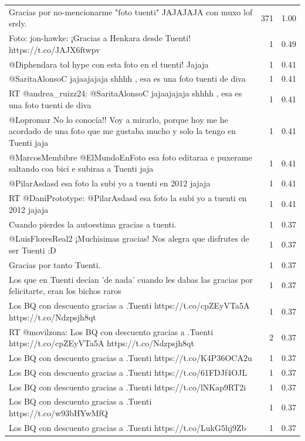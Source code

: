 \begin{longtable}{p{12.5cm}rr}
\bottomrule
\endlastfoot
Gracias por no-mencionarme "foto tuenti" JAJAJAJA con muxo lof srsly. & 371 & 1.00 \\
Foto: jon-hawke: ¡Gracias a Henkara desde Tuenti! https://t.co/JAJX6ftwpv & 1 & 0.49 \\
@Diphendara tol hype con esta foto en el tuenti! Jajaja & 1 & 0.41 \\
@SaritaAlonsoC jajaajajaja shhhh , esa es una foto tuenti de diva & 1 & 0.41 \\
RT @andrea\_ruizz24: @SaritaAlonsoC jajaajajaja shhhh , esa es una foto tuenti de diva & 1 & 0.41 \\
@Lopromar No lo conocía!! Voy a mirarlo, porque hoy me he acordado de una foto que me gustaba mucho y solo la tengo en Tuenti jaja & 1 & 0.41 \\
@MarcosMembibre @ElMundoEnFoto esa foto editaraa e puxerame saltando coa bici e subiraa a Tuenti jaja & 1 & 0.41 \\
@PilarAsdasd esa foto la subi yo a tuenti en 2012 jajaja & 1 & 0.41 \\
RT @DaniPrototype: @PilarAsdasd esa foto la subi yo a tuenti en 2012 jajaja & 1 & 0.41 \\
Cuando pierdes la autoestima gracias a tuenti. & 1 & 0.37 \\
@LuisFloresReal2  ¡Muchisimas gracias! Nos alegra que disfrutes de ser Tuenti :D & 1 & 0.37 \\
Gracias por tanto Tuenti. & 1 & 0.37 \\
Los que en Tuenti decían 'de nada' cuando les dabas las gracias por felicitarte, eran los bichos raros & 1 & 0.37 \\
Los BQ con descuento gracias a .Tuenti https://t.co/cpZEyVTa5A https://t.co/Ndzpsjh8qt & 1 & 0.37 \\
RT @movilzona: Los BQ con descuento gracias a .Tuenti https://t.co/cpZEyVTa5A https://t.co/Ndzpsjh8qt & 2 & 0.37 \\
Los BQ con descuento gracias a .Tuenti https://t.co/K4P36OCA2u & 1 & 0.37 \\
Los BQ con descuento gracias a .Tuenti https://t.co/61FDJf4OJL & 1 & 0.37 \\
Los BQ con descuento gracias a .Tuenti https://t.co/lNKap9RT2i & 1 & 0.37 \\
Los BQ con descuento gracias a .Tuenti https://t.co/w93bHYwMfQ & 1 & 0.37 \\
Los BQ con descuento gracias a .Tuenti https://t.co/LukG5hj9Zb & 1 & 0.37 \\

\end{longtable}
\clearpage

